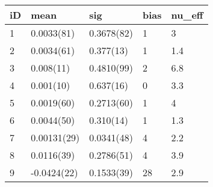 
\begin{tabular}{l|l|l|l|l}
\hline
iD & mean & sig & bias & nu\_eff\\
\hline
1 & 0.0033(81) & 0.3678(82) & 1 & 3\\
\hline
2 & 0.0034(61) & 0.377(13) & 1 & 1.4\\
\hline
3 & 0.008(11) & 0.4810(99) & 2 & 6.8\\
\hline
4 & 0.001(10) & 0.637(16) & 0 & 3.3\\
\hline
5 & 0.0019(60) & 0.2713(60) & 1 & 4\\
\hline
6 & 0.0044(50) & 0.310(14) & 1 & 1.3\\
\hline
7 & 0.00131(29) & 0.0341(48) & 4 & 2.2\\
\hline
8 & 0.0116(39) & 0.2786(51) & 4 & 3.9\\
\hline
9 & -0.0424(22) & 0.1533(39) & 28 & 2.9\\
\hline
\end{tabular}
